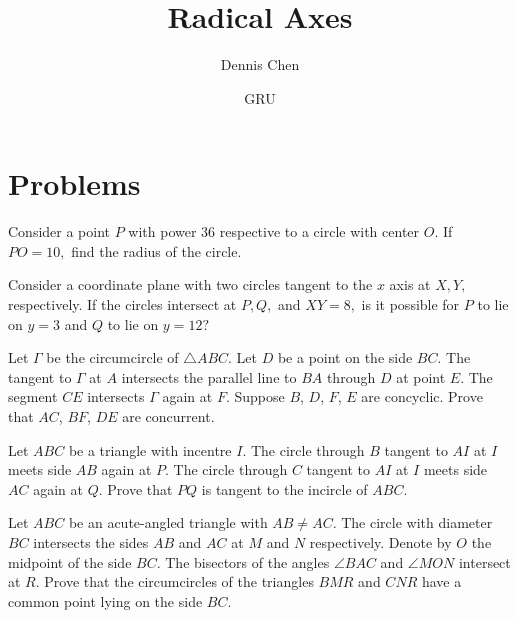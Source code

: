 \documentclass{article}
\title{Radical Axes}
\author{Dennis Chen}
\date{GRU}
\begin{document}
\maketitle



\pagebreak
\section{Problems}

\begin{prob}[]{1}
Consider a point $P$ with power $36$ respective to a circle with center $O.$ If $PO=10,$ find the radius of the circle.
\end{prob}

\begin{prob}[]{2}
Consider a coordinate plane with two circles tangent to the $x$ axis at $X,Y,$ respectively. If the circles intersect at $P,Q,$ and $XY=8,$ is it possible for $P$ to lie on $y=3$ and $Q$ to lie on $y=12?$
\end{prob}

\begin{prob}[APMO 2020/1]{3}
Let $\Gamma$ be the circumcircle of $\triangle ABC$. Let $D$ be a point on the side $BC$. The tangent to $\Gamma$ at $A$ intersects the parallel line to $BA$ through $D$ at point $E$. The segment $CE$ intersects $\Gamma$ again at $F$. Suppose $B$, $D$, $F$, $E$ are concyclic. Prove that $AC$, $BF$, $DE$ are concurrent.

\end{prob}

\begin{prob}[EGMO 2019/4]{3}
Let $ABC$ be a triangle with incentre $I$. The circle through $B$ tangent to $AI$ at $I$ meets side $AB$ again at $P$. The circle through $C$ tangent to $AI$ at $I$ meets side $AC$ again at $Q$. Prove that $PQ$ is tangent to the incircle of $ABC.$
\end{prob}

\begin{prob}[IMO 2004/1]{4}
Let $ABC$ be an acute-angled triangle with $AB\neq AC$. The circle with diameter $BC$ intersects the sides $AB$ and $AC$ at $M$ and $N$ respectively. Denote by $O$ the midpoint of the side $BC$. The bisectors of the angles $\angle BAC$ and $\angle MON$ intersect at $R$. Prove that the circumcircles of the triangles $BMR$ and $CNR$ have a common point lying on the side $BC$.
\end{prob}
\end{document}
